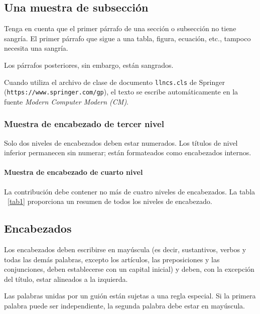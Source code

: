 \documentclass[runningheads,a4paper]{llncs}
\begin{document}
\subsection{Una muestra de subsección}
Tenga en cuenta que el primer párrafo de una sección o subsección no tiene sangría. El primer párrafo que sigue a una tabla, figura,
ecuación, etc., tampoco necesita una sangría.

Los párrafos posteriores, sin embargo, están sangrados.

Cuando utiliza el archivo de clase de documento \texttt{llncs.cls} de Springer (\texttt{https://www.springer.com/gp}), el texto se escribe automáticamente en la fuente \textit{Modern Computer Modern (CM)}.

\subsubsection{Muestra de encabezado de tercer nivel} 
Solo dos niveles de encabezados deben estar numerados. Los títulos de nivel inferior permanecen sin numerar; están formateados como encabezados internos.

\paragraph{Muestra de encabezado de cuarto nivel}
La contribución debe contener no más de cuatro niveles de encabezados. La tabla ~\ref{tab1} proporciona un resumen de todos los niveles de encabezado.

\subsection{Encabezados}
Los encabezados deben escribirse en mayúscula (es decir, sustantivos, verbos y todas las demás palabras, excepto los artículos, las preposiciones y las conjunciones, deben establecerse con un capital inicial) y deben, con la excepción del título, estar alineados a la izquierda. 

Las palabras unidas por un guión están sujetas a una regla especial. Si la primera palabra puede ser independiente, la segunda palabra debe estar en mayúscula.
\end{document}
